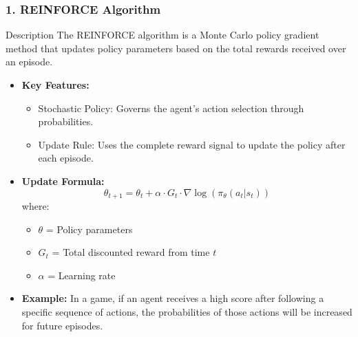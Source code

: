 \documentclass{beamer}
\begin{document}
\begin{frame}[fragile]
    \frametitle{1. REINFORCE Algorithm}
    
    \begin{block}{Description}
        The REINFORCE algorithm is a Monte Carlo policy gradient method that updates policy parameters based on the total rewards received over an episode.
    \end{block}
    
    \begin{itemize}
        \item \textbf{Key Features:}
        \begin{itemize}
            \item Stochastic Policy: Governs the agent's action selection through probabilities.
            \item Update Rule: Uses the complete reward signal to update the policy after each episode.
        \end{itemize}
        
        \item \textbf{Update Formula:}
        \begin{equation}
        \theta_{t+1} = \theta_t + \alpha \cdot G_t \cdot \nabla \log(\pi_\theta(a_t | s_t))
        \end{equation}
        where:
        \begin{itemize}
            \item $\theta$ = Policy parameters
            \item $G_t$ = Total discounted reward from time $t$
            \item $\alpha$ = Learning rate
        \end{itemize}
        
        \item \textbf{Example:}
        In a game, if an agent receives a high score after following a specific sequence of actions, the probabilities of those actions will be increased for future episodes.
    \end{itemize}
\end{frame}
\end{document}
